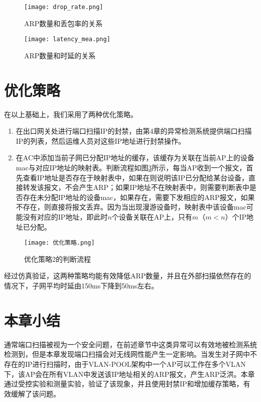 \begin{figure}
  \centering
  \texttt{[image: drop\_rate.png]}
  \caption{ARP数量和丢包率的关系}
  \label{fig:丢包}
\end{figure}

\begin{figure}
  \centering
  \texttt{[image: latency\_mea.png]}
  \caption{ARP数量和时延的关系}
  \label{fig:时延}
\end{figure}
\section{优化策略}
在以上基础上，我们采用了两种优化策略。
\begin{enumerate}
  \item 在出口网关处进行端口扫描IP的封禁，由第4章的异常检测系统提供端口扫描IP的列表，然后运维人员对这些IP地址进行封禁操作。
  \item 在AC中添加当前子网已分配IP地址的缓存，该缓存为关联在当前AP上的设备mac与对应IP地址的映射表。判断流程如图\ref{fig:优化策略}所示，每当AP收到一个报文，首先查看IP地址是否存在于映射表中，如果在则说明该IP已分配给某台设备，直接转发该报文，不会产生ARP；如果IP地址不在映射表中，则需要判断表中是否存在未分配IP地址的设备mac，如果存在，需要下发相应的ARP报文，如果不存在，则直接将报文丢弃。因为当出现漫游设备时，映射表中该设备mac可能没有对应的IP地址，即此时$n$个设备关联在AP上，只有$m$（$m<n$）个IP地址已分配。
\end{enumerate}
\begin{figure}
  \centering
  \texttt{[image: 优化策略.png]}
  \caption{优化策略2的判断流程}
  \label{fig:优化策略}
\end{figure}
经过仿真验证，这两种策略均能有效降低ARP数量，并且在外部扫描依然存在的情况下，子网平均时延由150ms下降到50ms左右。

\section{本章小结}
通常端口扫描被视为一个安全问题，在前述章节中这类异常可以有效地被检测系统检测到，但是本章发现端口扫描会对无线网性能产生一定影响。当发生对子网中不存在的IP进行扫描时，由于VLAN-POOL架构中一个AP可以工作在多个VLAN下，该AP会在所有VLAN中发送该IP地址相关的ARP报文，产生ARP泛洪。本章通过受控实验和测量实验，验证了该现象，并且使用封禁IP和增加缓存策略，有效缓解了该问题。